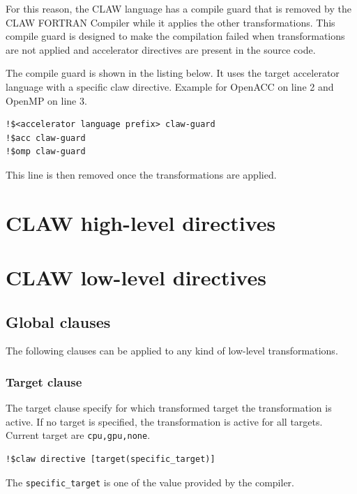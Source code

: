 \documentclass{article}
\begin{document}
For this reason, the CLAW language has a compile guard that is removed by the
CLAW FORTRAN Compiler while it applies the other transformations. This compile
guard is designed to make the compilation failed when transformations are not
applied and accelerator directives are present in the source code.

The compile guard is shown in the listing below. It uses the target accelerator
language with a specific claw directive. Example for OpenACC on line 2 and
OpenMP on line 3.

\begin{lstlisting}
!$<accelerator language prefix> claw-guard
!$acc claw-guard
!$omp claw-guard
\end{lstlisting}

This line is then removed once the transformations are applied.

\section{CLAW high-level directives}


\section{CLAW low-level directives}

\subsection{Global clauses}
The following clauses can be applied to any kind of low-level transformations.

\subsubsection{Target clause}
The target clause specify for which transformed target the transformation is
active. If no target is specified, the transformation is active for all targets.
Current target are \lstinline|cpu,gpu,none|.

\begin{lstlisting}
!$claw directive [target(specific_target)]
\end{lstlisting}

The \lstinline|specific_target| is one of the value provided by the compiler.






\appendix

\end{document}
